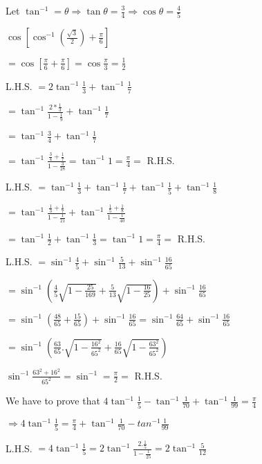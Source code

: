 \item Let $\tan^{-1} = \theta \Rightarrow \tan\theta = \frac{3}{4} \Rightarrow \cos\theta = \frac{4}{5}$

\item $\cos\left[\cos^{-1}\left(\frac{\sqrt{3}}{2}\right) + \frac{\pi}{6}\right]$

  $=\cos\left[\frac{\pi}{6} + \frac{\pi}{6}\right] = \cos \frac{\pi}{3} = \frac{1}{2}$

\item L.H.S. $= 2\tan^{-1}\frac{1}{3} + \tan^{-1}\frac{1}{7}$

  $= \tan^{-1}\frac{2*\frac{1}{3}}{1 - \frac{1}{9}} + \tan^{-1}\frac{1}{7}$

  $= \tan^{-1}\frac{3}{4} + \tan^{-1}\frac{1}{7}$

  $= \tan^{-1}\frac{\frac{3}{4} + \frac{1}{7}}{1 - \frac{3}{28}} = \tan^{-1}1 = \frac{\pi}{4} =$ R.H.S.

\item L.H.S. $= \tan^{-1}\frac{1}{3} + \tan^{-1}\frac{1}{7} + \tan^{-1}\frac{1}{5} + \tan^{-1}\frac{1}{8}$

  $= \tan^{-1}\frac{\frac{1}{3} + \frac{1}{7}}{1 - \frac{1}{21}} + \tan^{-1}\frac{\frac{1}{5} + \frac{1}{8}}{1 -
  \frac{1}{40}}$

  $= \tan^{-1}\frac{1}{2} + \tan^{-1}\frac{1}{3} = \tan^{-1}1 = \frac{\pi}{4} =$ R.H.S.

\item L.H.S. $= \sin^{-1}\frac{4}{5} + \sin^{-1}\frac{5}{13} + \sin^{-1}\frac{16}{65}$

  $= \sin^{-1}\left(\frac{4}{5}\sqrt{1 - \frac{25}{169}} + \frac{5}{13}\sqrt{1 - \frac{16}{25}}\right) +
  \sin^{-1}\frac{16}{65}$

  $= \sin^{-1}\left(\frac{48}{65} + \frac{15}{65}\right) + \sin^{-1}\frac{16}{65} = \sin^{-1}\frac{64}{65} +
  \sin^{-1}\frac{16}{65}$

  $= \sin^{-1}\left(\frac{63}{65}.\sqrt{1 - \frac{16^2}{65^2}} + \frac{16}{65}\sqrt{1 - \frac{63^2}{65^2}}\right)$

  $\sin^{-1}\frac{63^2 + 16^2}{65^2} = \sin^{-1} = \frac{\pi}{2} =$ R.H.S.

\item We have to prove that $4\tan^{-1}\frac{1}{5} - \tan^{-1}\frac{1}{70} + \tan^{-1}\frac{1}{99} = \frac{\pi}{4}$

  $\Rightarrow 4\tan^{-1}\frac{1}{5} = \frac{\pi}{4} + \tan^{-1}\frac{1}{70} - tan^{-1}\frac{1}{99}$

  L.H.S. $= 4\tan^{-1}\frac{1}{5} = 2\tan^{-1}\frac{2.\frac{1}{5}}{1 - \frac{1}{25}} = 2\tan^{-1}\frac{5}{12}$

